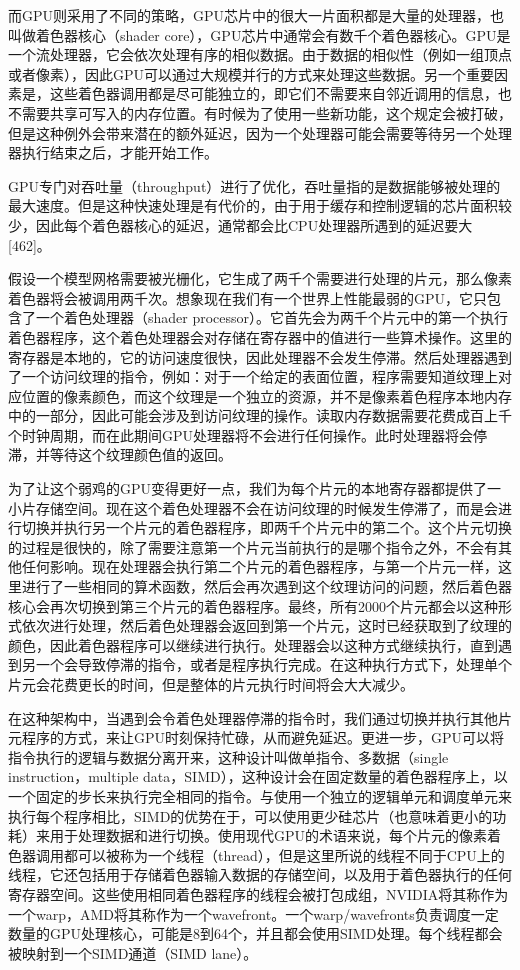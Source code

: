 \documentclass[
  paper=a4,
  ,captions=tableheading
]{scrartcl}
\begin{document}
而GPU则采用了不同的策略，GPU芯片中的很大一片面积都是大量的处理器，也叫做着色器核心（shader
core），GPU芯片中通常会有数千个着色器核心。GPU是一个流处理器，它会依次处理有序的相似数据。由于数据的相似性（例如一组顶点或者像素），因此GPU可以通过大规模并行的方式来处理这些数据。另一个重要因素是，这些着色器调用都是尽可能独立的，即它们不需要来自邻近调用的信息，也不需要共享可写入的内存位置。有时候为了使用一些新功能，这个规定会被打破，但是这种例外会带来潜在的额外延迟，因为一个处理器可能会需要等待另一个处理器执行结束之后，才能开始工作。

GPU专门对吞吐量（throughput）进行了优化，吞吐量指的是数据能够被处理的最大速度。但是这种快速处理是有代价的，由于用于缓存和控制逻辑的芯片面积较少，因此每个着色器核心的延迟，通常都会比CPU处理器所遇到的延迟要大{[}462{]}。

假设一个模型网格需要被光栅化，它生成了两千个需要进行处理的片元，那么像素着色器将会被调用两千次。想象现在我们有一个世界上性能最弱的GPU，它只包含了一个着色处理器（shader
processor）。它首先会为两千个片元中的第一个执行着色器程序，这个着色处理器会对存储在寄存器中的值进行一些算术操作。这里的寄存器是本地的，它的访问速度很快，因此处理器不会发生停滞。然后处理器遇到了一个访问纹理的指令，例如：对于一个给定的表面位置，程序需要知道纹理上对应位置的像素颜色，而这个纹理是一个独立的资源，并不是像素着色程序本地内存中的一部分，因此可能会涉及到访问纹理的操作。读取内存数据需要花费成百上千个时钟周期，而在此期间GPU处理器将不会进行任何操作。此时处理器将会停滞，并等待这个纹理颜色值的返回。

为了让这个弱鸡的GPU变得更好一点，我们为每个片元的本地寄存器都提供了一小片存储空间。现在这个着色处理器不会在访问纹理的时候发生停滞了，而是会进行切换并执行另一个片元的着色器程序，即两千个片元中的第二个。这个片元切换的过程是很快的，除了需要注意第一个片元当前执行的是哪个指令之外，不会有其他任何影响。现在处理器会执行第二个片元的着色器程序，与第一个片元一样，这里进行了一些相同的算术函数，然后会再次遇到这个纹理访问的问题，然后着色器核心会再次切换到第三个片元的着色器程序。最终，所有2000个片元都会以这种形式依次进行处理，然后着色处理器会返回到第一个片元，这时已经获取到了纹理的颜色，因此着色器程序可以继续进行执行。处理器会以这种方式继续执行，直到遇到另一个会导致停滞的指令，或者是程序执行完成。在这种执行方式下，处理单个片元会花费更长的时间，但是整体的片元执行时间将会大大减少。

在这种架构中，当遇到会令着色处理器停滞的指令时，我们通过切换并执行其他片元程序的方式，来让GPU时刻保持忙碌，从而避免延迟。更进一步，GPU可以将指令执行的逻辑与数据分离开来，这种设计叫做单指令、多数据（single
instruction，multiple
data，SIMD），这种设计会在固定数量的着色器程序上，以一个固定的步长来执行完全相同的指令。与使用一个独立的逻辑单元和调度单元来执行每个程序相比，SIMD的优势在于，可以使用更少硅芯片（也意味着更小的功耗）来用于处理数据和进行切换。使用现代GPU的术语来说，每个片元的像素着色器调用都可以被称为一个线程（thread），但是这里所说的线程不同于CPU上的线程，它还包括用于存储着色器输入数据的存储空间，以及用于着色器执行的任何寄存器空间。这些使用相同着色器程序的线程会被打包成组，NVIDIA将其称作为一个warp，AMD将其称作为一个wavefront。一个warp/wavefronts负责调度一定数量的GPU处理核心，可能是8到64个，并且都会使用SIMD处理。每个线程都会被映射到一个SIMD通道（SIMD
lane）。
\end{document}
